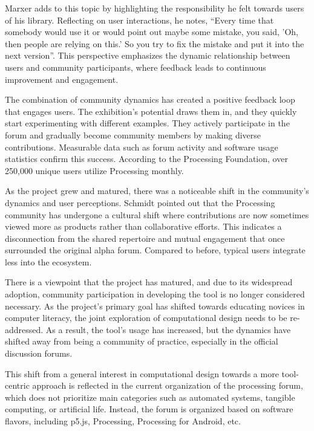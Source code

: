 Marxer adds to this topic by highlighting the responsibility he felt towards users of his library. Reflecting on user interactions, he notes, \enquote{Every time that somebody would use it or would point out maybe some mistake, you said, ’Oh, then people are relying on this.’ So you try to fix the mistake and put it into the next version}. This perspective emphasizes the dynamic relationship between users and community participants, where feedback leads to continuous improvement and engagement.

The combination of community dynamics has created a positive feedback loop that engages users. The exhibition’s potential draws them in, and they quickly start experimenting with different examples. They actively participate in the forum and gradually become community members by making diverse contributions. Measurable data such as forum activity and software usage statistics confirm this success. According to the Processing Foundation, over 250,000 unique users utilize Processing monthly.

As the project grew and matured, there was a noticeable shift in the community’s dynamics and user perceptions. Schmidt pointed out that the Processing community has undergone a cultural shift where contributions are now sometimes viewed more as products rather than collaborative efforts. This indicates a disconnection from the shared repertoire and mutual engagement that once surrounded the original alpha forum. Compared to before, typical users integrate less into the ecosystem.

There is a viewpoint that the project has matured, and due to its widespread adoption, community participation in developing the tool is no longer considered necessary. As the project’s primary goal has shifted towards educating novices in computer literacy, the joint exploration of computational design needs to be re-addressed. As a result, the tool’s usage has increased, but the dynamics have shifted away from being a community of practice, especially in the official discussion forums.



This shift from a general interest in computational design towards a more tool-centric approach is reflected in the current organization of the processing forum, which does not prioritize main categories such as automated systems, tangible computing, or artificial life. Instead, the forum is organized based on software flavors, including p5.js, Processing, Processing for Android, etc.

